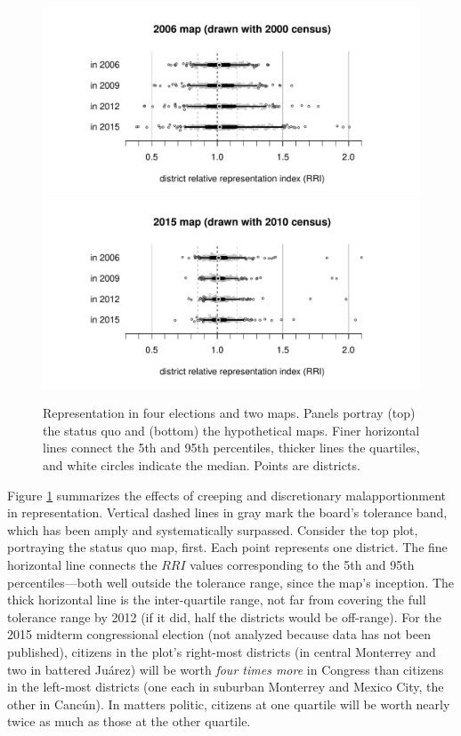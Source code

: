 \documentclass[letter,12pt]{article}
\begin{document}
\begin{figure}
\begin{center}
    \includegraphics[width=.65\columnwidth]{rrin0615d0.pdf} \\
    \includegraphics[width=.65\columnwidth]{rrin0615d3.pdf} \\
\caption{Representation in four elections and two maps. Panels portray (top) the status quo and (bottom) the hypothetical maps. Finer horizontal lines connect the 5th and 95th percentiles, thicker lines the quartiles, and white circles indicate the median. Points are districts.}\label{F:malapp}
\end{center}
\end{figure}

Figure \ref{F:malapp} summarizes the effects of creeping and discretionary malapportionment in representation. Vertical dashed lines in gray mark the board's tolerance band, which has been amply and systematically surpassed. Consider the top plot, portraying the status quo map, first. Each point represents one district. The fine horizontal line connects the $RRI$ values corresponding to the 5th and 95th percentiles---both well outside the tolerance range, since the map's inception. The thick horizontal line is the inter-quartile range, not far from covering the full tolerance range by 2012 (if it did, half the districts would be off-range). For the 2015 midterm congressional election (not analyzed because data has not been published), citizens in the plot's right-most districts (in central Monterrey and two in battered Ju\'arez) will be worth \emph{four times more} in Congress than citizens in the left-most districts (one each in suburban Monterrey and Mexico City, the other in Canc\'un). In matters politic, citizens at one quartile will be worth nearly twice as much as those at the other quartile. 
\end{document}
